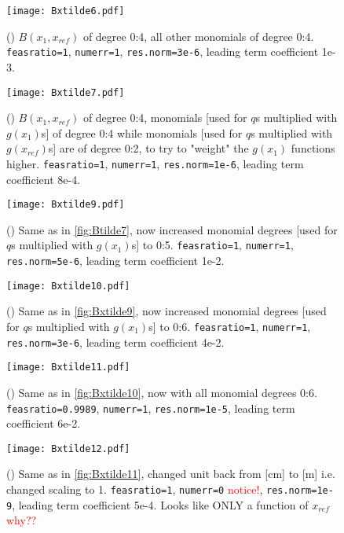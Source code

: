 \begin{figure}[h]
\centering\texttt{[image: Bxtilde6.pdf]}
\caption{() $B(x_1,x_{ref})$ of degree 0:4, all other monomials of degree 0:4. \texttt{feasratio=1}, \texttt{numerr=1}, \texttt{res.norm=3e-6}, leading term coefficient 1e-3.}
\label{fig:Bxtilde6}
\end{figure}

\begin{figure}[h]
\centering\texttt{[image: Bxtilde7.pdf]}
\caption{() $B(x_1,x_{ref})$ of degree 0:4,  monomials [used for $q$s multiplied with $g(x_1)$s] of degree 0:4 while monomials [used for $q$s multiplied with $g(x_{ref})$s] are of degree 0:2, to try to "weight" the $g(x_1)$ functions higher. \texttt{feasratio=1}, \texttt{numerr=1}, \texttt{res.norm=1e-6}, leading term coefficient 8e-4.}
\label{fig:Bxtilde7}
\end{figure}

\begin{figure}[H]
\centering\texttt{[image: Bxtilde9.pdf]}
\caption{() Same as in \autoref{fig:Btilde7}, now increased monomial degrees [used for $q$s multiplied with $g(x_1)$s] to 0:5. \texttt{feasratio=1}, \texttt{numerr=1}, \texttt{res.norm=5e-6}, leading term coefficient 1e-2.}
\label{fig:Bxtilde9}
\end{figure}

\begin{figure}[H]
\centering\texttt{[image: Bxtilde10.pdf]}
	\caption{() Same as in \autoref{fig:Bxtilde9}, now increased monomial degrees [used for $q$s multiplied with $g(x_1)$s] to 0:6. \texttt{feasratio=1}, \texttt{numerr=1}, \texttt{res.norm=3e-6}, leading term coefficient 4e-2.}
	\label{fig:Bxtilde10}
\end{figure}

\begin{figure}[H]
	\centering\texttt{[image: Bxtilde11.pdf]}
	\caption{() Same as in \autoref{fig:Bxtilde10}, now with all monomial degrees 0:6. \texttt{feasratio=0.9989}, \texttt{numerr=1}, \texttt{res.norm=1e-5}, leading term coefficient 6e-2.}
	\label{fig:Bxtilde11}
\end{figure}

\begin{figure}[H]
	\centering\texttt{[image: Bxtilde12.pdf]}
	\caption{() Same as in \autoref{fig:Bxtilde11}, changed unit back from [cm] to [m] i.e. changed scaling to 1. \texttt{feasratio=1}, \texttt{numerr=0} \textcolor{red}{notice!}, \texttt{res.norm=1e-9}, leading term coefficient 5e-4. Looks like ONLY a function of $x_{ref}$ \textcolor{red}{why??}}
	\label{fig:Bxtilde12}
\end{figure}

